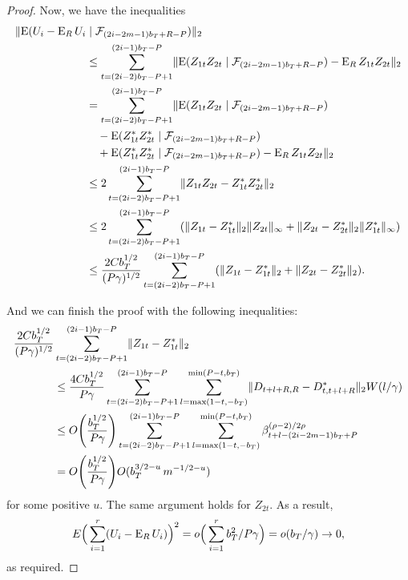 \documentclass[11pt]{article}
\begin{document}
\begin{proof}
Now, we have the inequalities
\begin{align*}
  \lVert \operatorname{E}( U_i - \operatorname{E}_R U_i & \mid \mathcal{F}_{(2i-2m-1)b_{T}+R-P}) \rVert_2
  \\ &\leq
  \sum_{t=(2i-2)b_T-P+1}^{(2i-1)b_T-P} \lVert \operatorname{E}(Z_{1t}Z_{2t} \mid \mathcal{F}_{(2i-2m-1)b_{T}+R-P}) - \operatorname{E}_R
  Z_{1t}Z_{2t} \rVert_2 \\
  &= \sum_{t=(2i-2)b_T-P+1}^{(2i-1)b_T-P} \lVert \operatorname{E}(Z_{1t}Z_{2t} \mid \mathcal{F}_{(2i-2m-1)b_{T}+R-P}) \\
  &\quad - \operatorname{E}(Z_{1t}^* Z_{2t}^* \mid \mathcal{F}_{(2i-2m-1)b_{T}+R-P}) \\
  &\quad + \operatorname{E}(Z_{1t}^* Z_{2t}^* \mid \mathcal{F}_{(2i-2m-1)b_{T}+R-P})
  - \operatorname{E}_R Z_{1t}Z_{2t} \rVert_2 \\
  &\leq 2 \sum_{t=(2i-2)b_T-P+1}^{(2i-1)b_T-P} \lVert Z_{1t} Z_{2t} - Z_{1t}^* Z_{2t}^*
  \rVert_2 \\
  &\leq 2 \sum_{t=(2i-2)b_T-P+1}^{(2i-1)b_T-P} (\lVert Z_{1t} - Z_{1t}^* \rVert_2 \lVert
  Z_{2t} \rVert_{\infty}
  + \lVert Z_{2t} - Z_{2t}^* \rVert_2 \lVert Z_{1t}^* \rVert_{\infty}) \\
  &\leq \frac{2 C b_T^{1/2}}{(P\gamma)^{1/2}} \sum_{t=(2i-2)b_T-P+1}^{(2i-1)b_T-P} (\lVert Z_{1t} - Z_{1t}^* \rVert_2
  + \lVert Z_{2t} - Z_{2t}^* \rVert_2).
\end{align*}

And we can finish the proof with the following inequalities:
\begin{align*}
  \frac{2 C b_T^{1/2}}{(P \gamma)^{1/2}} &\sum_{t=(2i-2)b_T-P+1}^{(2i-1)b_T-P} \lVert Z_{1t} - Z_{1t}^* \rVert_2 \\& \leq
  \frac{4C b_T^{1/2}}{P\gamma} \sum_{t=(2i-2)b_T-P+1}^{(2i-1)b_T-P} \sum_{l=\max(1-t,-b_T)}^{\min(P-t,b_T)} \lVert
  D_{t+l+R,R} - D_{t,t+l+R}^* \rVert_2 W(l/\gamma) \\&
  \leq O\Bigg(\frac{b_T^{1/2}}{P\gamma}\Bigg) \sum_{t=(2i-2)b_T-P+1}^{(2i-1)b_T-P}
  \sum_{l=\max(1-t,-b_T)}^{\min(P-t,b_T)} \beta^{(\rho-2)/2\rho}_{t+l-(2i-2m-1)b_T+P}\\&
  = O\Bigg(\frac{b_T^{1/2}}{P\gamma}\Bigg) O(b_T^{3/2-u}\, m^{-1/2-u})
\end{align*}
for some positive $u$.  The same argument holds for $Z_{2t}$.
As a result,
\[
E\Big(\sum_{i=1}^r (U_i - \operatorname{E}_R U_i)\Big)^2 = o\Big(\sum_{i=1}^r b_T^2/P\gamma\Big) =
 o(b_T/\gamma) \to 0,
\]
as required.
\end{proof}

\end{document}
